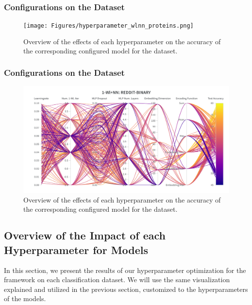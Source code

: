 \subsubsection{\wlnn Configurations on the \proteins Dataset}
\begin{figure}[H]
    \centering
    \texttt{[image: Figures/hyperparameter\_wlnn\_proteins.png]}
    \caption{Overview of the effects of each hyperparameter on the accuracy of the corresponding configured \wlnn model for the \proteins dataset.}
    \label{fig:wandb_wlnn_proteins}
\end{figure}

\subsubsection{\wlnn Configurations on the \reddit Dataset}
\begin{figure}[H]
    \centering
    \includegraphics[width=\textwidth, trim={0 75 0 150}, clip]{Figures/hyperparameter_wlnn_reddit.png}
    \caption{Overview of the effects of each hyperparameter on the accuracy of the corresponding configured \wlnn model for the \reddit dataset.}
    \label{fig:wandb_wlnn_reddit}
\end{figure}
\clearpage


\subsection{Overview of the Impact of each Hyperparameter for \gnn Models}
In this section, we present the results of our hyperparameter optimization for the \gnn framework on each classification dataset. We will use the same visualization explained and utilized in the previous section, customized to the hyperparameters of the \gnn models.

